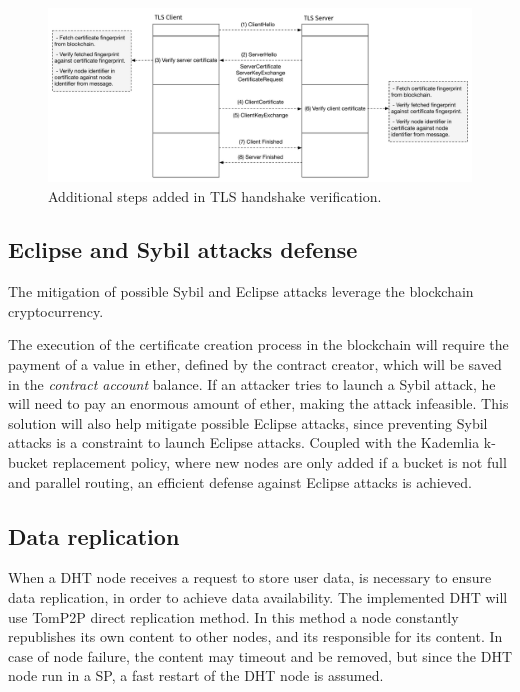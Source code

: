 {\begin{figure}
  \includegraphics[width=\linewidth]{Figures/tls-handshake-plus.pdf}
  \caption{Additional steps added in TLS handshake verification.}
\label{fig:tls-handshake-plus}
\end{figure}


\subsection{Eclipse and Sybil attacks defense}
The mitigation of possible Sybil and Eclipse attacks leverage the blockchain cryptocurrency.

The execution of the certificate creation process in the blockchain will require the payment of a value in ether, defined by the contract creator, which will be saved in the \textit{contract account} balance.
If an attacker tries to launch a Sybil attack, he will need to pay an enormous amount of ether, making the attack infeasible.
This solution will also help mitigate possible Eclipse attacks, since preventing Sybil attacks is a constraint to launch Eclipse attacks.
Coupled with the Kademlia k-bucket replacement policy, where new nodes are only added if a bucket is not full and parallel routing, an efficient defense against Eclipse attacks is achieved.

\subsection{Data replication}
When a DHT node receives a request to store user data, is necessary to ensure data replication, in order to achieve data availability.
The implemented DHT will use TomP2P direct replication method. In this method a node constantly republishes its own content to other nodes, and its responsible for its content.
In case of node failure, the content may timeout and be removed, but since the DHT node run in a SP, a fast restart of the DHT node is assumed.

}
